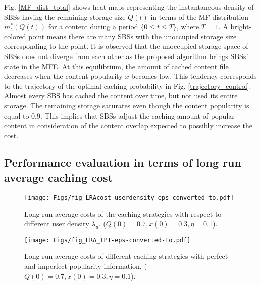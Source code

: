 \documentclass{book}
\begin{document}
            
            Fig. \ref{MF_dist_total}  shows heat-maps representing the instantaneous density of SBSs having the remaining storage size $Q(t)$ in terms of the MF distribution $m_t^*(Q(t))$ for a content during a period $\{0\leq t \leq T\}$, where $T=1$. A bright-colored point means there are many SBSs with the unoccupied storage size corresponding to the point. It is observed that the unoccupied storage space of SBSs does not diverge from each other as the proposed algorithm brings SBSs' state in the MFE.
            At this equilibrium, the amount of cached content file decreases when the content popularity $x$ becomes low. This tendency corresponds to the trajectory of the optimal caching probability in Fig. \ref{trajectory_control}.
            Almost every SBS has cached the content over time, but not used its entire storage. The remaining storage saturates even though the content popularity is equal to $0.9$. 
            This implies that SBSs adjust the caching amount of popular content in consideration of the content overlap expected to possibly increase the cost.  
            
            \subsection {Performance evaluation in terms of long run average caching cost}


            \begin{figure}
            \centering
            \texttt{[image: Figs/fig\_LRAcost\_userdensity-eps-converted-to.pdf]}   %
            \caption{{\small Long run average costs of the caching strategies with respect to different user density $\lambda_u$. ($Q(0)=0.7, x(0) =0.3, \eta=0.1$).} }\label{LRA_user} 
            \end{figure}
            
            \begin{figure}
            \centering
            \texttt{[image: Figs/fig\_LRA\_IPI-eps-converted-to.pdf]}   %
            \caption{{\small Long run average costs of different caching strategies with perfect and imperfect popularity information. ($Q(0)=0.7, x(0) =0.3, \eta=0.1$).} }\label{LRA} 
            \end{figure}
            
            
            
\end{document}
